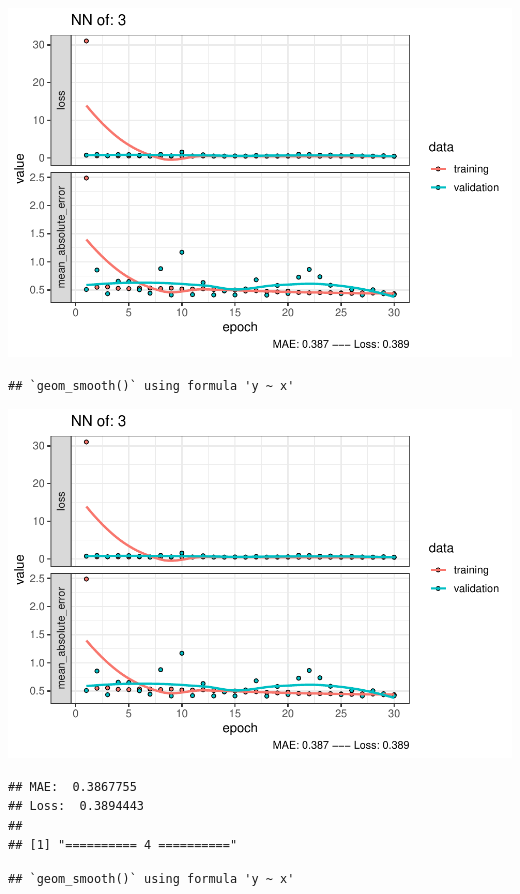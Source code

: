 \documentclass[
]{article}
\begin{document}
\includegraphics{project-code_files/figure-latex/unnamed-chunk-18-5.pdf}

\begin{verbatim}
## `geom_smooth()` using formula 'y ~ x'
\end{verbatim}

\includegraphics{project-code_files/figure-latex/unnamed-chunk-18-6.pdf}

\begin{verbatim}
## MAE:  0.3867755
## Loss:  0.3894443 
## 
## [1] "========== 4 =========="
\end{verbatim}

\begin{verbatim}
## `geom_smooth()` using formula 'y ~ x'
\end{verbatim}
\end{document}
